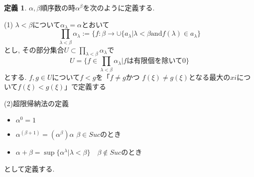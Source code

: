 \documentclass[dvipdfmx,a4paper,11pt]{report}
\theoremstyle{definition}
\newtheorem{dfn}[thm]{定義}
\begin{document}
 \begin{tcolorbox}
 [colback = white, colframe = green!35!black, fonttitle = \bfseries,breakable = true]
\begin{dfn}
$\alpha, \beta$順序数の時$\alpha^{\beta}$を次のように定義する. 

(1)
$\lambda < \beta$について$\alpha_{\lambda}=\alpha$とおいて
$$
\prod_{\lambda <\beta}\alpha_{\lambda}
:=
\{ f : \beta \to \cup\{ a_{\lambda}
|\lambda < \beta \text{and} f(\lambda) \in a_{\lambda}
\}
$$
とし, その部分集合$U \subset \prod_{\lambda <\beta}\alpha_{\lambda}$で
$$
U
=
\{ f \in \prod_{\lambda <\beta}\alpha_{\lambda} | \text{$f$は有限個を除いて0}\}
$$
とする.
$f,g \in U$について$f < g$を「$f \neq g$かつ
$f(\xi) \neq g(\xi)$となる最大の$xi$について$f(\xi) < g(\xi)$」で定義する


(2)超限帰納法の定義
\begin{itemize}
\item $\alpha^0 = 1$
\item $\alpha^(\beta+1) = (\alpha^\beta)\alpha$ $\beta \in Suc$のとき
\item $\alpha + \beta = \sup\{ \alpha^\lambda | \lambda<\beta\}$　$\beta \not \in Suc$のとき
\end{itemize}
\end{dfn}
として定義する. 
\end{tcolorbox}
\end{document}
